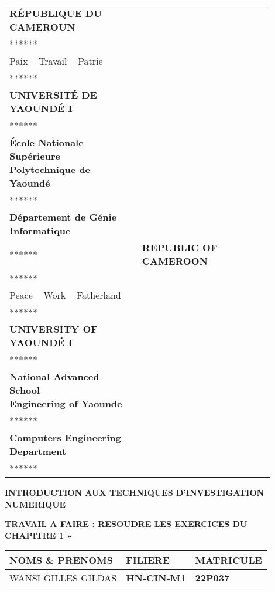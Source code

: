 \documentclass[12pt, a4paper]{article}
\begin{document}
\begin{titlepage}
    \centering

   

    \begin{tabular}{p{0.45\linewidth} p{0.45\linewidth}}
\centering
\textbf{RÉPUBLIQUE DU CAMEROUN}\\
******\\
Paix -- Travail -- Patrie\\
******\\
\textbf{UNIVERSITÉ DE YAOUNDÉ I}\\
******\\
\textbf {École Nationale Supérieure\\
Polytechnique de Yaoundé}\\
******\\
\textbf {Département de Génie Informatique}\\
****** &
\centering
\textbf{REPUBLIC OF CAMEROON}\\
******\\
Peace -- Work -- Fatherland\\
******\\
\textbf{UNIVERSITY OF YAOUNDÉ I}\\
******\\
\textbf {National Advanced School\\
Engineering of Yaounde}\\
******\\
\textbf {Computers Engineering Department}\\
****** \\
\end{tabular}
\vspace{3 cm}

    \begin{LARGE}

    \textbf{INTRODUCTION AUX TECHNIQUES D'INVESTIGATION NUMERIQUE}
    \end{LARGE}

    \vspace{2cm}

    \textbf{TRAVAIL A FAIRE : RESOUDRE LES EXERCICES DU CHAPITRE 1  »}

    \vspace{5cm}

    \begin{tabular}{|>{\centering\arraybackslash}p{5cm}|>{\centering\arraybackslash}p{3cm}|>{\centering\arraybackslash}p{3cm}|}
        \hline
        \textbf{NOMS \& PRENOMS} & \textbf{FILIERE  } & \textbf{MATRICULE} \\
        \hline
        WANSI GILLES GILDAS & \textbf{HN-CIN-M1} & \textbf{22P037} \\
        \hline
    \end{tabular}


\end{titlepage}
\end{document}
